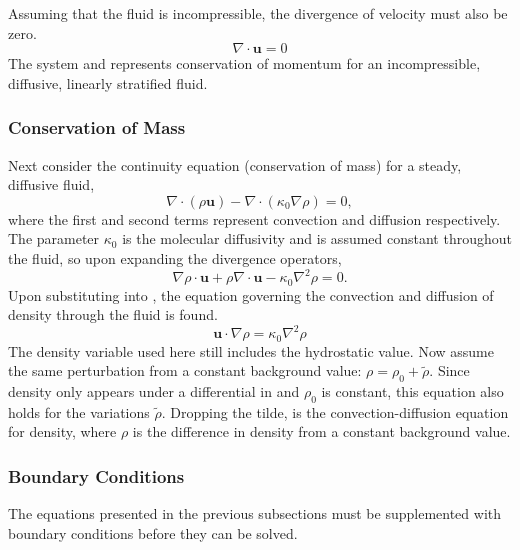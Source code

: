 \documentclass[12pt]{article}
\begin{document}
Assuming that the fluid is incompressible, the divergence of velocity must also be zero.
\begin{equation}
\label{eq:incomp}
\nabla\cdot\mathbf{u}=0
\end{equation}
The system  and  represents conservation of momentum for an incompressible, diffusive, linearly stratified fluid.

\subsubsection{Conservation of Mass}

Next consider the continuity equation (conservation of mass) for a steady, diffusive fluid,
\begin{equation}
\label{eq:convection_diffusion}
\nabla\cdot(\rho\mathbf{u})-\nabla\cdot(\kappa_0\nabla\rho)=0,
\end{equation}
where the first and second terms represent convection and diffusion respectively. The parameter $\kappa_0$ is the molecular diffusivity and is assumed constant throughout the fluid, so upon expanding the divergence operators,
\begin{equation}
\label{eq:cons_mass_1}
\nabla\rho\cdot\mathbf{u}+\rho\nabla\cdot\mathbf{u}-\kappa_0\nabla^2\rho=0.
\end{equation}
Upon substituting  into , the equation governing the convection and diffusion of density through the fluid is found.
\begin{equation}
\label{eq:ad_diff}
\mathbf{u}\cdot\nabla\rho=\kappa_0\nabla^2\rho
\end{equation}
The density variable used here still includes the hydrostatic value. Now assume the same perturbation from a constant background value: $\rho=\rho_0+\tilde{\rho}$. Since density only appears under a differential in  and $\rho_0$ is constant, this equation also holds for the variations $\tilde{\rho}$. Dropping the tilde,  is the convection-diffusion equation for density, where $\rho$ is the difference in density from a constant background value.

\subsubsection{Boundary Conditions}

The equations presented in the previous subsections must be supplemented with boundary conditions before they can be solved.
\end{document}
